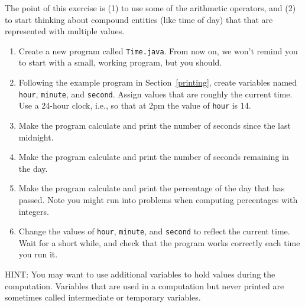 \begin{exercise}

The point of this exercise is (1) to use some of the arithmetic operators, and (2) to start thinking about compound entities (like time of day) that that are represented with multiple values.

\begin{enumerate}

\item Create a new program called {\tt Time.java}.
From now on, we won't remind you to start with a small, working program, but you should.

\item Following the example program in Section~\ref{printing}, create variables named {\tt hour}, {\tt minute}, and {\tt second}. Assign values that are roughly the current time.
Use a 24-hour clock, i.e., so that at 2pm the value of {\tt hour} is 14.

\item Make the program calculate and print the number of seconds since the last midnight.

\item Make the program calculate and print the number of seconds remaining in the day.

\item Make the program calculate and print the percentage of the day that has passed.
Note you might run into problems when computing percentages with integers.

\item Change the values of {\tt hour}, {\tt minute}, and {\tt second} to reflect the current time.
Wait for a short while, and check that the program works correctly each time you run it.

\end{enumerate}

HINT: You may want to use additional variables to hold values during the computation.
Variables that are used in a computation but never printed are sometimes called intermediate or temporary variables.

\end{exercise}
